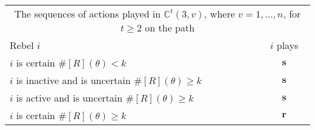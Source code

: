 \documentclass[12pt,letter]{article}
\newcommand{\Kappa}{\mathbb{C}}
\theoremstyle{definition}
\theoremstyle{remark}
\theoremstyle{claim}
\begin{document}
\begin{table}[!htbp]
\begin{center}
\begin{tabular}{l c}
\multicolumn{2}{c}{The sequences of actions played in $\Kappa^t(3,v)$, where $v=1,...,n$, for $t\geq 2$ on the path}\\
Rebel $i$ 	 	&  	$i$ plays		 \\
\hline
\hline
$i$ is certain $\#[R](\theta)<k$ 	& 	$\textbf{s}$	\\
$i$ is inactive and is uncertain $\#[R](\theta)\geq k$	& 	$ \textbf{s} $	\\
$i$ is active and is uncertain $\#[R](\theta)\geq k$ &  $ \textbf{s} $  \\
$i$ is certain $\#[R](\theta)\geq k$ &  $ \textbf{r} $  \\
\hline
\end{tabular}
\end{center}
\end{table}
\end{document}
